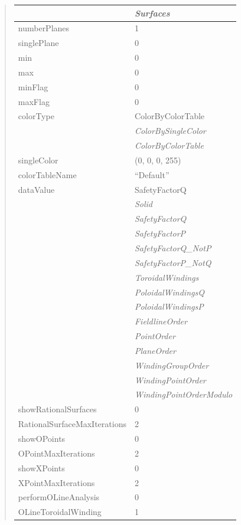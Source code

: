 \documentclass[letterpaper,10pt,english]{sphinxmanual}
\begin{document}
\begin{quote}
\begin{longtable}{|l|l|}
\hline & 
\emph{Surfaces}
\\
\hline
numberPlanes
 & 
1
\\
\hline
singlePlane
 & 
0
\\
\hline
min
 & 
0
\\
\hline
max
 & 
0
\\
\hline
minFlag
 & 
0
\\
\hline
maxFlag
 & 
0
\\
\hline
colorType
 & 
ColorByColorTable
\\
\hline & 
\emph{ColorBySingleColor}
\\
\hline & 
\emph{ColorByColorTable}
\\
\hline
singleColor
 & 
(0, 0, 0, 255)
\\
\hline
colorTableName
 & 
``Default''
\\
\hline
dataValue
 & 
SafetyFactorQ
\\
\hline & 
\emph{Solid}
\\
\hline & 
\emph{SafetyFactorQ}
\\
\hline & 
\emph{SafetyFactorP}
\\
\hline & 
\emph{SafetyFactorQ\_NotP}
\\
\hline & 
\emph{SafetyFactorP\_NotQ}
\\
\hline & 
\emph{ToroidalWindings}
\\
\hline & 
\emph{PoloidalWindingsQ}
\\
\hline & 
\emph{PoloidalWindingsP}
\\
\hline & 
\emph{FieldlineOrder}
\\
\hline & 
\emph{PointOrder}
\\
\hline & 
\emph{PlaneOrder}
\\
\hline & 
\emph{WindingGroupOrder}
\\
\hline & 
\emph{WindingPointOrder}
\\
\hline & 
\emph{WindingPointOrderModulo}
\\
\hline
showRationalSurfaces
 & 
0
\\
\hline
RationalSurfaceMaxIterations
 & 
2
\\
\hline
showOPoints
 & 
0
\\
\hline
OPointMaxIterations
 & 
2
\\
\hline
showXPoints
 & 
0
\\
\hline
XPointMaxIterations
 & 
2
\\
\hline
performOLineAnalysis
 & 
0
\\
\hline
OLineToroidalWinding
 & 
1
\\

\end{longtable}
\end{quote}
\end{document}
